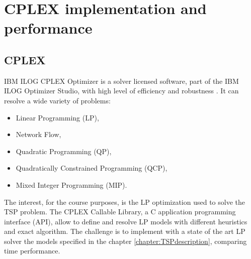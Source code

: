 \chapter{CPLEX implementation and performance}

\section{CPLEX}
IBM ILOG CPLEX Optimizer is a solver licensed software, part of the IBM ILOG Optimizer Studio, with high level of efficiency and robustness \cite{IBMILOGCPLEX}. It can resolve a wide variety of problems:
\begin{itemize}
	\item Linear Programming (LP),
	\item Network Flow,
	\item Quadratic Programming (QP),
	\item Quadratically Constrained Programming (QCP),
	\item Mixed Integer Programming (MIP).
\end{itemize}
The interest, for the course purposes, is the LP optimization used to solve the TSP problem. The CPLEX Callable Library, a C application programming interface (API), allow to define and resolve LP models with different heuristics and exact algorithm. The challenge is to implement with a state of the art LP solver the models specified in the chapter \ref{chapter:TSPdescription}, comparing time performance. 




